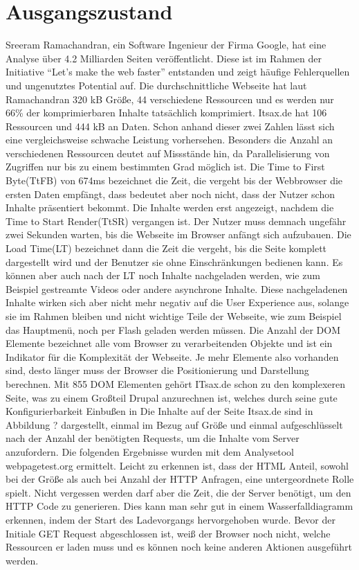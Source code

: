 \section{Ausgangszustand}
Sreeram Ramachandran, ein Software Ingenieur der Firma Google, hat eine Analyse über 4.2 Milliarden Seiten veröffentlicht. Diese ist im Rahmen der Initiative ``Let's make the web faster'' entstanden und zeigt häufige Fehlerquellen und ungenutztes Potential auf. Die durchschnittliche Webseite hat laut Ramachandran 320 kB Größe, 44 verschiedene Ressourcen und es werden nur 66\% der komprimierbaren Inhalte tatsächlich komprimiert. 
Itsax.de hat 106 Ressourcen und 444 kB an Daten. Schon anhand dieser zwei Zahlen lässt sich eine vergleichsweise schwache Leistung vorhersehen. Besonders die Anzahl an verschiedenen Ressourcen deutet auf Missstände hin, da Parallelisierung von Zugriffen nur bis zu einem bestimmten Grad möglich ist. Die Time to First Byte(TtFB) von 674ms bezeichnet die Zeit, die vergeht bis der Webbrowser die ersten Daten empfängt, dass bedeutet aber noch nicht, dass der Nutzer schon Inhalte präsentiert bekommt. Die Inhalte werden erst angezeigt, nachdem die Time to Start Render(TtSR) vergangen ist. Der Nutzer muss demnach ungefähr zwei Sekunden warten, bis die Webseite im Browser anfängt sich aufzubauen. Die Load Time(LT) bezeichnet dann die Zeit die vergeht, bis die Seite komplett dargestellt wird und der Benutzer sie ohne Einschränkungen bedienen kann. Es können aber auch nach der LT noch Inhalte nachgeladen werden, wie zum Beispiel gestreamte Videos oder andere asynchrone Inhalte. Diese nachgeladenen Inhalte wirken sich aber nicht mehr negativ auf die User Experience aus, solange sie im Rahmen bleiben und nicht wichtige Teile der Webseite, wie zum Beispiel das Hauptmenü, noch per Flash geladen werden müssen. Die Anzahl der DOM Elemente bezeichnet alle vom Browser zu verarbeitenden Objekte und ist ein Indikator für die Komplexität der Webseite. Je mehr Elemente also vorhanden sind, desto länger muss der Browser die Positionierung und Darstellung berechnen. Mit 855 DOM Elementen gehört ITsax.de schon zu den komplexeren Seite, was zu einem Großteil Drupal anzurechnen ist, welches durch seine gute Konfigurierbarkeit Einbußen in    Die Inhalte auf der Seite Itsax.de sind in Abbildung ? dargestellt, einmal im Bezug auf Größe und einmal aufgeschlüsselt nach der Anzahl der benötigten Requests, um die Inhalte vom Server anzufordern. Die folgenden Ergebnisse wurden mit dem Analysetool webpagetest.org ermittelt. Leicht zu erkennen ist, dass der HTML Anteil, sowohl bei der Größe als auch bei Anzahl der HTTP Anfragen, eine untergeordnete Rolle spielt. Nicht vergessen werden darf aber die Zeit, die der Server benötigt, um den HTTP Code zu generieren. Dies kann man sehr gut in einem Wasserfalldiagramm erkennen, indem der Start des Ladevorgangs hervorgehoben wurde. Bevor der Initiale GET Request abgeschlossen ist, weiß der Browser noch nicht, welche Ressourcen er laden muss und es können noch keine anderen Aktionen ausgeführt werden.
